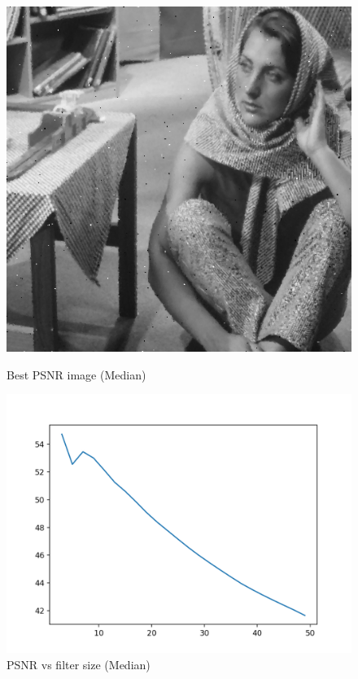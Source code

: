 \documentclass{article}
\begin{document}
    \begin{figure}[!htb]
      \includegraphics[scale=0.3]{./basic_denoising/barbara/median_best_sp.png}
      \caption{Best PSNR image (Median)}
    \endminipage \hfill
      \includegraphics[scale=.45]{./basic_denoising/barbara/median_psnr_sp.png}
      \caption{PSNR vs filter size (Median)}
    \endminipage
    \end{figure}
    \pagebreak
    
\end{document}
